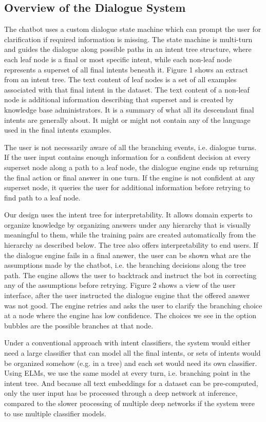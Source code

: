 \documentclass[sigconf, anonymous=true]{acmart}
\begin{document}
\subsection{Overview of the Dialogue System}
\label{chabotOverview}
The chatbot uses a custom dialogue state machine which can prompt the user for clarification if required information is missing. The state machine is multi-turn and guides the dialogue along possible paths in an intent tree structure, where each leaf node is a final or most specific intent, while each non-leaf node represents a superset of all final intents beneath it. Figure 1 shows an extract from an intent tree. The text content of leaf nodes is a set of all examples associated with that final intent in the dataset. The text content of a non-leaf node is additional information describing that superset and is created by knowledge base administrators. It is a summary of what all its descendant final intents are generally about. It might or might not contain any of the language used in the final intents examples.  

The user is not necessarily aware of all the branching events, i.e. dialogue turns. If the user input contains enough information for a confident decision at every superset node along a path to a leaf node, the dialogue engine ends up returning the final action or final answer in one turn. If the engine is not confident at any superset node, it queries the user for additional information before retrying to find path to a leaf node. 

Our design uses the intent tree for interpretability. It allows domain experts to organize knowledge by organizing answers under any hierarchy that is visually meaningful to them, while the training pairs are created automatically from the hierarchy as described below. The tree also offers interpretability to end users. If the dialogue engine fails in a final answer, the user can be shown what are the assumptions made by the chatbot, i.e. the branching decisions along the tree path. The engine allows the user to backtrack and instruct the bot in correcting any of the assumptions before retrying. Figure 2 shows a view of the user interface, after the user instructed the dialogue engine that the offered answer was not good. The engine retries and asks the user to clarify the branching choice at a node where the engine has low confidence. The choices we see in the option bubbles are the possible branches at that node. 

Under a conventional approach with intent classifiers, the system would either need a large classifier that can model all the final intents, or sets of intents would be organized somehow (e.g. in a tree) and each set would need its own classifier. Using ELMs, we use the same model at every turn, i.e. branching point in the intent tree. And because all text embeddings for a dataset can be pre-computed, only the user input has be processed through a deep network at inference, compared to the slower processing of multiple deep networks if the system were to use multiple classifier models. 
\end{document}
